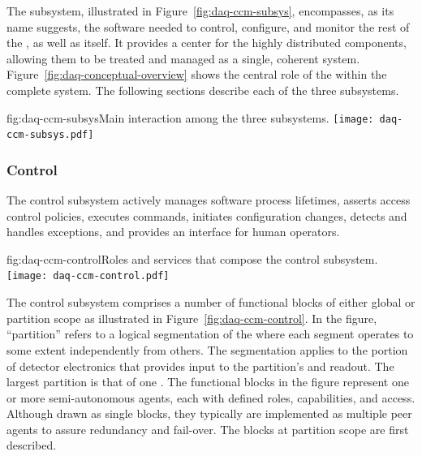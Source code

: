 The  subsystem, illustrated in Figure~\ref{fig:daq-ccm-subsys}, encompasses, as its name suggests, the software needed to control, configure, and monitor the rest of the , as well as itself. 
It provides a center for the highly distributed  components, allowing them to be treated and managed as a single, coherent system. 
Figure~\ref{fig:daq-conceptual-overview} shows the central role of the  within the complete  system.
The following sections describe each of the three  subsystems. 

\begin{dunefigure}{fig:daq-ccm-subsys}{Main interaction among the three  subsystems.}
  \texttt{[image: daq-ccm-subsys.pdf]}
\end{dunefigure}

\subsubsection{Control}
\label{sec:daq:design:ccm:control}


The  control subsystem actively manages  software process lifetimes, asserts access control policies, executes commands, initiates configuration changes, detects and handles exceptions, and provides an interface for human operators.


\begin{dunefigure}{fig:daq-ccm-control}{Roles and services that compose the  control subsystem.}
  \texttt{[image: daq-ccm-control.pdf]}
\end{dunefigure}

The control subsystem comprises a number of functional blocks of either global or partition scope as illustrated in Figure~\ref{fig:daq-ccm-control}. 
In the figure, ``partition'' refers to a logical segmentation of the  where each segment operates to some extent independently from others. 
The segmentation applies to the portion of detector electronics that provides input to the partition's  and readout. 
The largest partition %
is that of one . 
The functional blocks in the figure represent one or more semi-autonomous agents, each with defined roles, capabilities, and access. 
Although drawn as single blocks, they typically are implemented as multiple peer agents to assure redundancy and fail-over. 
The blocks at partition scope are first described.

